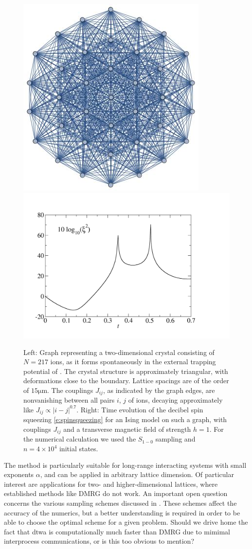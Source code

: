 \documentclass[aps,prl,showpacs,amsmath,amssymb,superscriptaddress,reprint,10pt]{revtex4-1}
\newcommand{\ar}[1]{{\color{analabha} #1}}
\begin{document}
\begin{bibunit}
\begin{figure}\centering
\includegraphics[height=0.4\linewidth]{./Crystal.jpg}
\includegraphics[height=0.43\linewidth]{./bollinger217.jpg}
\caption{\label{f:2d}%
Left: Graph representing a two-dimensional crystal consisting of $N=217$ ions, as it forms spontaneously in the external trapping potential of \cite{Britton_etal12}. The crystal structure is approximately triangular, with deformations close to the boundary. Lattice spacings are of the order of $15\mathrm{\mu m}$. The couplings $J_{ij}$, as indicated by the graph edges, are nonvanishing between all pairs $i$, $j$ of ions, decaying approximately like $J_{ij}\propto|i-j|^{0.7}$. Right: Time evolution of the decibel spin squeezing \eqref{e:spinsqueezing} for an Ising model on such a graph, with couplings $J_{ij}$ and a transverse magnetic field of strength $h=1$. For the numerical calculation we used the $S_{1-0}$ sampling and $n=4\times10^4$ initial states. 
}%
\end{figure}

The method is particularly suitable for long-range interacting systems with small exponents $\alpha$, and can be applied in arbitrary lattice dimension. Of particular interest are applications for two- and higher-dimensional lattices, where established methods like DMRG do not work. An important open question concerns the various sampling schemes discussed in \cite{Note1}. These schemes affect the accuracy of the numerics, but a better understanding is required in order to be able to choose the optimal scheme for a given problem. \ar{ Should we drive home the fact that dtwa is computationally much faster than DMRG due to mimimal interprocess communications, or is this too obvious to mention?}



\end{bibunit}
\end{document}
